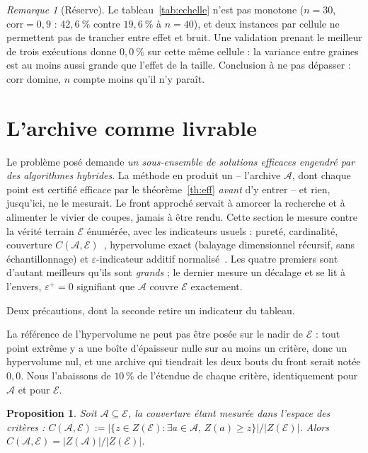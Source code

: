 \documentclass[11pt,a4paper]{article}
\theoremstyle{plain}
\newtheorem{proposition}{Proposition}
\theoremstyle{remark}
\newtheorem{remark}{Remarque}
\newcommand{\Ecal}{\mathcal{E}}
\newcommand{\Acal}{\mathcal{A}}
\begin{document}
\begin{remark}[Réserve]
Le tableau~\ref{tab:echelle} n'est pas monotone ($n=30$, $\text{corr}=0{,}9$ :
$42{,}6\ \%$ contre $19{,}6\ \%$ à $n=40$), et deux instances par cellule ne
permettent pas de trancher entre effet et bruit. Une validation prenant le
meilleur de trois exécutions donne $0{,}0\ \%$ sur cette même cellule : la
variance entre graines est au moins aussi grande que l'effet de la taille.
Conclusion à ne pas dépasser : corr domine, $n$ compte moins qu'il n'y paraît.
\end{remark}

\section{L'archive comme livrable}
\label{sec:livrable}

Le problème posé demande \emph{un sous-ensemble de solutions efficaces
engendré par des algorithmes hybrides}. La méthode en produit un --
l'archive $\Acal$, dont chaque point est certifié efficace par le
théorème~\ref{th:eff} \emph{avant} d'y entrer -- et rien, jusqu'ici, ne le
mesurait. Le front approché servait à amorcer la recherche et à alimenter le
vivier de coupes, jamais à être rendu. Cette section le mesure contre la
vérité terrain $\Ecal$ énumérée, avec les indicateurs usuels : pureté,
cardinalité, couverture $C(\Acal,\Ecal)$~\cite{zitzler1999}, hypervolume exact
(balayage dimensionnel récursif, sans échantillonnage) et
$\varepsilon$-indicateur additif normalisé~\cite{zitzler2003}. Les quatre
premiers sont d'autant meilleurs qu'ils sont \emph{grands} ; le dernier
mesure un décalage et se lit à l'envers, $\varepsilon^+=0$ signifiant que
$\Acal$ couvre $\Ecal$ exactement.

Deux précautions, dont la seconde retire un indicateur du tableau.

La référence de l'hypervolume ne peut pas être posée sur le nadir de
$\Ecal$ : tout point extrême y a une boîte d'épaisseur nulle sur au moins un
critère, donc un hypervolume nul, et une archive qui tiendrait les deux bouts
du front serait notée $0{,}0$. Nous l'abaissons de $10\,\%$ de l'étendue de
chaque critère, identiquement pour $\Acal$ et pour $\Ecal$.

\begin{proposition}\label{prop:couv}
Soit $\Acal\subseteq\Ecal$, la couverture étant mesurée \emph{dans l'espace
des critères} : $C(\Acal,\Ecal):=\bigl|\{z\in Z(\Ecal):\exists a\in\Acal,\,
Z(a)\ge z\}\bigr|/|Z(\Ecal)|$. Alors
$C(\Acal,\Ecal)=|Z(\Acal)|/|Z(\Ecal)|$.
\end{proposition}
\end{document}
